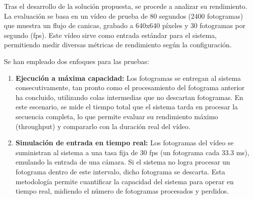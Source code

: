 \documentclass[11pt,spanish,listoffigures,listoftables]{tfgetsinf}
\begin{document}
Tras el desarrollo de la solución propuesta, se procede a analizar su rendimiento. La evaluación se basa en un vídeo de prueba de 80 segundos (2400 fotogramas) que muestra un flujo de canicas, grabado a 640x640 píxeles y 30 fotogramas por segundo (fps). Este vídeo sirve como entrada estándar para el sistema, permitiendo medir diversas métricas de rendimiento según la configuración.

Se han empleado dos enfoques para las pruebas:
\begin{enumerate}
   \item \textbf{Ejecución a máxima capacidad:} Los fotogramas se entregan al sistema consecutivamente, tan pronto como el procesamiento del fotograma anterior ha concluido, utilizando colas intermedias que no descartan fotogramas. En este escenario, se mide el tiempo total que el sistema tarda en procesar la secuencia completa, lo que permite evaluar su rendimiento máximo (throughput) y compararlo con la duración real del vídeo.
   \item \textbf{Simulación de entrada en tiempo real:} Los fotogramas del vídeo se suministran al sistema a una tasa fija de 30 fps (un fotograma cada 33.3 ms), emulando la entrada de una cámara. Si el sistema no logra procesar un fotograma dentro de este intervalo, dicho fotograma se descarta. Esta metodología permite cuantificar la capacidad del sistema para operar en tiempo real, midiendo el número de fotogramas procesados y perdidos.
\end{enumerate}
\end{document}
